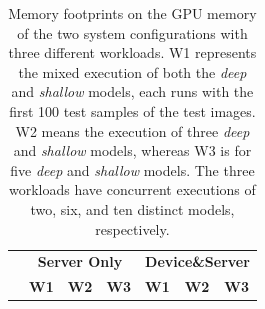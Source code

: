 \documentclass[format=acmsmall, review=false, screen=true]{acmart}
\begin{document}
    \begin{table}[hbt]
    \centering
    \caption{Memory footprints on the GPU memory of the two system configurations with three different workloads. W1 represents the mixed execution of both the \emph{deep} and \emph{shallow} models, each runs with the first 100 test samples of the test images. W2 means the execution of three \emph{deep} and \emph{shallow} models, whereas W3 is for five \emph{deep} and \emph{shallow} models. The three workloads have concurrent executions of two, six, and ten distinct models, respectively.}
    \label{tab:serverloading}
    \scriptsize{
    \begin{tabular}{lllllll}
    \multicolumn{1}{l|}{}                                                                                        & \multicolumn{3}{c|}{\textbf{Server Only}}                                                                                                                                          & \multicolumn{3}{c}{\textbf{Device\&Server}}                                                                                                                               \\
    \multicolumn{1}{l|}{}                                                & \textbf{W1}                                         & \textbf{W2}                                        & \multicolumn{1}{l|}{\textbf{W3}}                                        & \textbf{W1}                                       & \textbf{W2}                                               & \textbf{W3}                                               \\ \hline \hline


\end{tabular}}
\end{table}
\end{document}
